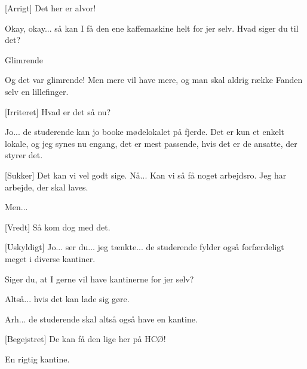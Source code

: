 \documentclass[a4paper,11pt]{article}
\begin{document}
\begin{sketch}
[Arrigt] Det her er alvor!

 Okay, okay... så kan I få den ene kaffemaskine helt for jer selv. Hvad siger du til det?

 Glimrende


 Og det var glimrende! Men mere vil have mere, og man skal aldrig række Fanden selv en lillefinger.



[Irriteret] Hvad er det så nu?

 Jo... de studerende kan jo booke mødelokalet på fjerde. Det er kun et enkelt lokale, og jeg synes nu engang, det er mest passende, hvis det er de ansatte, der styrer det.

[Sukker] Det kan vi vel godt sige. Nå... Kan vi så få noget arbejdsro. Jeg har arbejde, der skal laves.


 Men...

[Vredt] Så kom dog med det.

[Uskyldigt] Jo... ser du... jeg tænkte... de studerende fylder også forfærdeligt meget i diverse kantiner.

 Siger du, at I gerne vil have kantinerne for jer selv?

 Altså... hvis det kan lade sig gøre.

 Arh... de studerende skal altså også have en kantine.

[Begejstret] De kan få den lige her på HCØ!

 En rigtig kantine.

\end{sketch}
\end{document}
